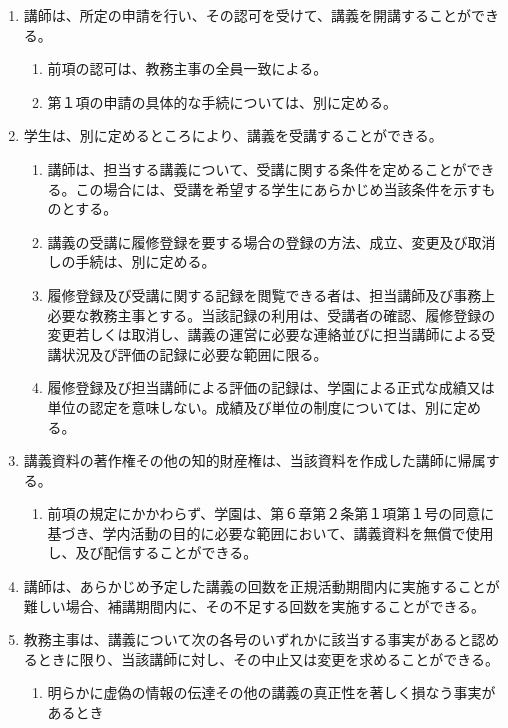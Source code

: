 \begin{enumerate}[label=第\arabic*条　]
\begin{enumerate}[label=\arabic*　,start=2,leftmargin=*]
  \end{enumerate}
  \item 講師は、所定の申請を行い、その認可を受けて、講義を開講することができる。
    \begin{enumerate}[label=\arabic*　,start=2,leftmargin=*]
      \item 前項の認可は、教務主事の全員一致による。
      \item 第１項の申請の具体的な手続については、別に定める。
    \end{enumerate}
  \item 学生は、別に定めるところにより、講義を受講することができる。
    \begin{enumerate}[label=\arabic*　,start=2,leftmargin=*]
      \item 講師は、担当する講義について、受講に関する条件を定めることができる。この場合には、受講を希望する学生にあらかじめ当該条件を示すものとする。
      \item 講義の受講に履修登録を要する場合の登録の方法、成立、変更及び取消しの手続は、別に定める。
      \item 履修登録及び受講に関する記録を閲覧できる者は、担当講師及び事務上必要な教務主事とする。当該記録の利用は、受講者の確認、履修登録の変更若しくは取消し、講義の運営に必要な連絡並びに担当講師による受講状況及び評価の記録に必要な範囲に限る。
      \item 履修登録及び担当講師による評価の記録は、学園による正式な成績又は単位の認定を意味しない。成績及び単位の制度については、別に定める。
    \end{enumerate}
  \item 講義資料の著作権その他の知的財産権は、当該資料を作成した講師に帰属する。
    \begin{enumerate}[label=\arabic*　,start=2,leftmargin=*]
      \item 前項の規定にかかわらず、学園は、第６章第２条第１項第１号の同意に基づき、学内活動の目的に必要な範囲において、講義資料を無償で使用し、及び配信することができる。
    \end{enumerate}
  \item 講師は、あらかじめ予定した講義の回数を正規活動期間内に実施することが難しい場合、補講期間内に、その不足する回数を実施することができる。
  \item 教務主事は、講義について次の各号のいずれかに該当する事実があると認めるときに限り、当該講師に対し、その中止又は変更を求めることができる。
      \begin{enumerate}[label=(\arabic*)　]
        \item 明らかに虚偽の情報の伝達その他の講義の真正性を著しく損なう事実があるとき

\end{enumerate}
\end{enumerate}
